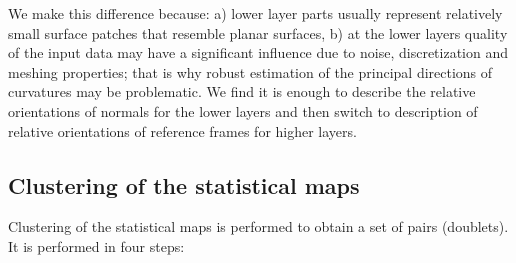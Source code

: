 \documentclass[runningheads]{llncs}
\begin{document}
    We make this difference because: a) lower layer parts usually represent relatively small
    surface patches that resemble planar surfaces, b) at the lower layers
    quality of the input data may have a significant influence due to noise,
    discretization and meshing properties; that is why robust estimation of the principal
    directions of curvatures may be problematic. We find it is enough to
    describe the
    relative orientations of normals for the lower layers and then
    switch to description of relative orientations of reference frames for higher layers.



\subsection{Clustering of the statistical maps\label{sec:Clustering}}

Clustering of the statistical maps is performed to obtain a set of
pairs (doublets). It is performed in four steps:
\end{document}
